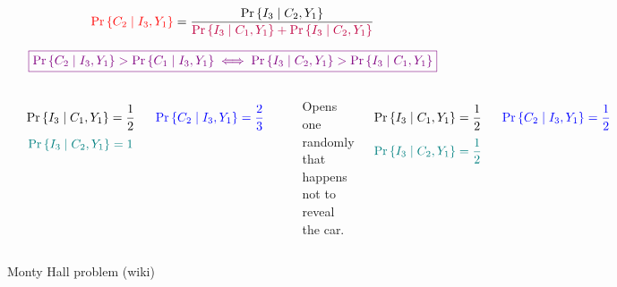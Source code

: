 \begin{frame}{}
  \[
    \textcolor{red}{\Pr\left\{C_2 \mid I_3, Y_1\right\}} = \frac{\Pr{\left\{I_3 \mid C_2, Y_1\right\}}}
      {\textcolor{purple}{\Pr\left\{I_3 \mid C_1, Y_1\right\} + \Pr\left\{I_3 \mid C_2, Y_1\right\}}}
  \]

  \[
    \textcolor{violet}{\boxed{\Pr\left\{C_2 \mid I_3, Y_1\right\} > \Pr\left\{C_1 \mid I_3, Y_1\right\} \iff \Pr{\left\{I_3 \mid C_2, Y_1\right\}} > \Pr{\left\{I_3 \mid C_1, Y_1\right\}}}}
  \]

  \begin{columns}
      \centerline{\textsc{}}

      \[
	\Pr\left\{I_3 \mid C_1, Y_1\right\} = \frac{1}{2}
      \]
      \[
	\textcolor{teal}{\Pr\left\{I_3 \mid C_2, Y_1\right\} = 1}
      \]

      \[
	\textcolor{blue}{\Pr\left\{C_2 \mid I_3, Y_1\right\} = \frac{2}{3}}
      \]
      \pause
      \centerline{\textsc{}}
      \begin{center}
	{Opens one randomly that happens not to reveal the car.}
      \end{center}

      \pause
      \vspace{-0.50cm}
      \[
	\Pr\left\{I_3 \mid C_1, Y_1\right\} = \frac{1}{2}
      \]
      \[
	\textcolor{teal}{\Pr\left\{I_3 \mid C_2, Y_1\right\} = \frac{1}{2}}
      \]

      \[
	\textcolor{blue}{\Pr\left\{C_2 \mid I_3, Y_1\right\} = \frac{1}{2}}
      \]
  \end{columns}
\end{frame}

\begin{frame}{}

  \vspace{-0.30cm}
  \centerline{Monty Hall problem (wiki)}
\end{frame}
